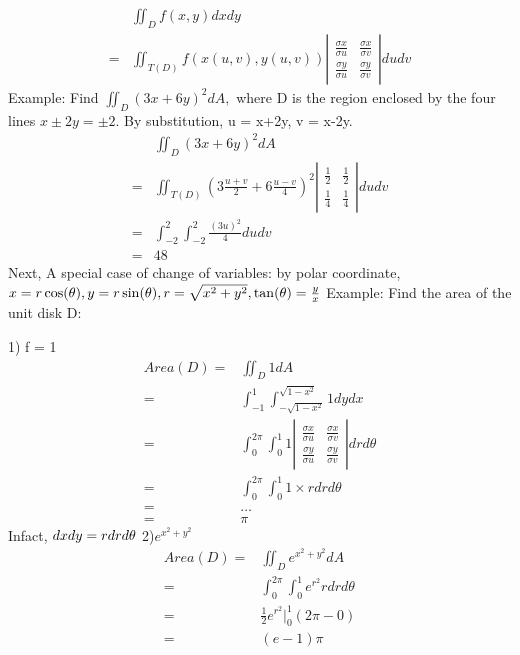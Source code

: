 \documentclass{article}
\begin{document}
        \begin{align}
            &\iint_D f(x,y) dxdy\\
            =& \iint_{T(D)} f(x(u,v), y(u,v)) \left|\begin{array}{cc}
                 \frac{\sigma x}{\sigma u} & \frac{\sigma x}{\sigma v}  \\
                 \frac{\sigma y}{\sigma u} & \frac{\sigma y}{\sigma v}
            \end{array}\right|dudv
        \end{align}
        Example: Find $\iint_D (3x+6y)^2 dA,$ where D is the region enclosed by the four lines $x\pm2y = \pm2$. By substitution, u = x+2y, v = x-2y.
        \begin{align}
            &\iint_D (3x+6y)^2 dA\\
            =& \iint_{T(D)} (3\frac{u+v}{2} + 6\frac{u-v}{4})^2 \left|\begin{array}{cc}
                 \frac{1}{2} & \frac{1}{2}  \\
                 \frac{1}{4} & \frac{1}{4}
            \end{array}\right|dudv\\
            =& \int^2_{-2}\int^2_{-2} \frac{(3u)^2}{4} dudv\\
            =&48
        \end{align}
        Next, A special case of change of variables: by polar coordinate, $x= r\cos(\theta), y= r\sin(\theta), r=\sqrt{x^2+y^2}, \tan(\theta) = \frac{y}{x}\\$
        Example: Find the area of the unit disk D:
        
        1) f = 1
        \begin{align}
            Area(D) =& \iint_D 1dA\\
            =& \int^1_{-1}\int^{\sqrt{1-x^2}}_{-\sqrt{1-x^2}} 1 dydx\\
            =& \int^{2\pi}_0 \int^{1}_0 1 \left|\begin{array}{cc}
                 \frac{\sigma x}{\sigma u} & \frac{\sigma x}{\sigma v}  \\
                 \frac{\sigma y}{\sigma u} & \frac{\sigma y}{\sigma v}
            \end{array}\right|drd\theta\\
            =& \int^{2\pi}_0 \int^{1}_0 1 \times r drd\theta\\
            =& \dots\\
            =& \pi
        \end{align}
        Infact, $dxdy = rdrd\theta\\$
        2)$e^{x^2+y^2}$
        \begin{align}
            Area(D) =& \iint_D e^{x^2+y^2}dA\\
            =& \int^{2\pi}_{0}\int^{1}_{0} e^{r^2} rdrd\theta\\
            =& \frac{1}{2} e^{r^2}|^1_0 (2\pi-0)\\
            =& (e-1)\pi
        \end{align}
\end{document}
